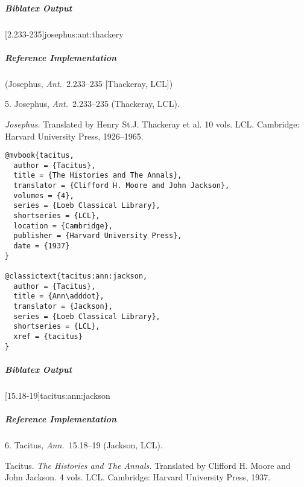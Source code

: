 \documentclass[a4paper]{article}
\newenvironment{biboutput}{%
  \subparagraph{Biblatex Output}
}{\color{black}}
\newenvironment{refimp}{%
  \subparagraph{Reference Implementation}
  \color{reference-colour}
  \rm
}{\par\color{black}}
\begin{document}
\begin{biboutput}
  [2.233-235]{josephus:ant:thackery}
\end{biboutput}

\begin{refimp}
  (Josephus, \emph{Ant.}\ 2.233–235 [Thackeray, LCL])

  \hspace*{\bibindent}5. Josephus, \emph{Ant.}\ 2.233–235 (Thackeray, LCL).

  \hangindent\bibindent \emph{Josephus.} Translated by Henry St.\@ J.
  Thackeray et al. 10 vols. LCL. Cambridge: Harvard University Press,
  1926–1965.

\end{refimp}

\medskip

\begin{lstlisting}
@mvbook{tacitus,
  author = {Tacitus},
  title = {The Histories and The Annals},
  translator = {Clifford H. Moore and John Jackson},
  volumes = {4},
  series = {Loeb Classical Library},
  shortseries = {LCL},
  location = {Cambridge},
  publisher = {Harvard University Press},
  date = {1937}
}

@classictext{tacitus:ann:jackson,
  author = {Tacitus},
  title = {Ann\adddot},
  translator = {Jackson},
  series = {Loeb Classical Library},
  shortseries = {LCL},
  xref = {tacitus}
}
\end{lstlisting}

\begin{biboutput}
  [15.18-19]{tacitus:ann:jackson}
\end{biboutput}

\begin{refimp}
  \hspace*{\bibindent}6. Tacitus, \emph{Ann.}\ 15.18–19 (Jackson, LCL).

  \hangindent\bibindent Tacitus. \emph{The Histories and The Annals.}
  Translated by Clifford H. Moore and John Jackson. 4 vols. LCL. Cambridge:
  Harvard University Press, 1937.

\end{refimp}

\medskip
\end{document}
